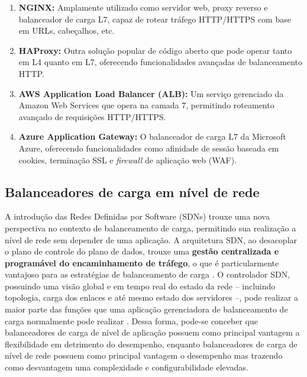 \begin{enumerate}
    \item \textbf{NGINX:} Amplamente utilizado como servidor web, proxy reverso e balanceador de carga L7, capaz de rotear tráfego HTTP/HTTPS com base em URLs, cabeçalhos, etc.
    \item \textbf{HAProxy:} Outra solução popular de código aberto que pode operar tanto em L4 quanto em L7, oferecendo funcionalidades avançadas de balanceamento HTTP.
    \item \textbf{AWS Application Load Balancer (ALB):} Um serviço gerenciado da Amazon Web Services que opera na camada 7, permitindo roteamento avançado de requisições HTTP/HTTPS.
    \item \textbf{Azure Application Gateway:} O balanceador de carga L7 da Microsoft Azure, oferecendo funcionalidades como afinidade de sessão baseada em cookies, terminação SSL e \textit{firewall} de aplicação web (WAF).
\end{enumerate}

\subsection{Balanceadores de carga em nível de rede}

A introdução das Redes Definidas por Software (SDNs) trouxe uma nova perspectiva no contexto de balanceamento de carga, permitindo sua realização a nível de rede sem depender de uma aplicação. A arquitetura SDN, ao desacoplar o plano de controle do plano de dados, trouxe uma \textbf{gestão centralizada e programável do encaminhamento de tráfego}, o que é particularmente vantajoso para as estratégias de balanceamento de carga \cite{BelgaumRiyazMusaShahrulnizaAlamMansoorSuudMohd2020}. O controlador SDN, possuindo uma visão global e em tempo real do estado da rede – incluindo topologia, carga dos enlaces e até mesmo estado dos servidores –, pode realizar a maior parte das funções que uma aplicação gerenciadora de balanceamento de carga normalmente pode realizar \cite{hamdan2021}. Dessa forma, pode-se conceber que balanceadores de carga de nível de aplicação possuem como principal vantagem a flexibilidade em detrimento do desempenho, enquanto balanceadores de carga de nível de rede possuem como principal vantagem o desempenho mas trazendo como desvantagem uma complexidade e configurabilidade elevadas.


